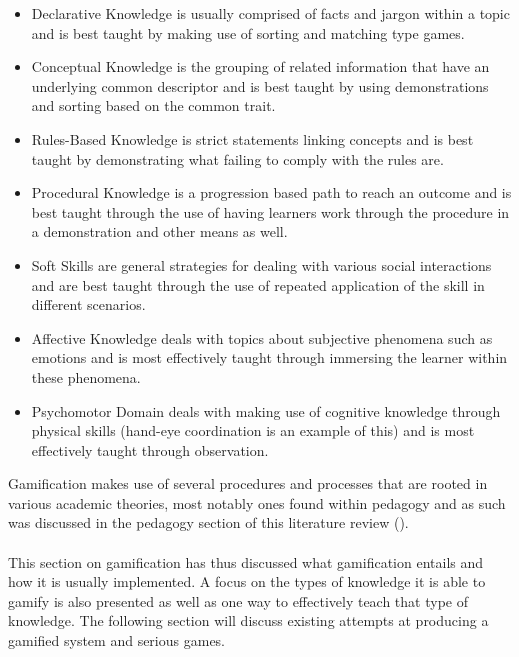 \begin{itemize}
\item Declarative Knowledge is usually comprised of facts and jargon within a topic and is best taught by making use of sorting and matching type games.
\item Conceptual Knowledge is the grouping of related information that have an underlying common descriptor and is best taught by using demonstrations and sorting based on the common trait.
\item Rules-Based Knowledge is strict statements linking concepts and is best taught by demonstrating what failing to comply with the rules are.
\item Procedural Knowledge is a progression based path to reach an outcome and is best taught through the use of having learners work through the procedure in a demonstration and other means as well.
\item Soft Skills are general strategies for dealing with various social interactions and are best taught through the use of repeated application of the skill in different scenarios.
\item Affective Knowledge deals with topics about subjective phenomena such as emotions and is most effectively taught through immersing the learner within these phenomena.

\item Psychomotor Domain deals with making use of cognitive knowledge through physical skills (hand-eye coordination is an example of this) and is most effectively taught through observation.
\end{itemize}
Gamification makes use of several procedures and processes that are rooted in various academic theories, most notably ones found within pedagogy and as such was discussed in the pedagogy section of this literature review (\cite{KappArticle2012}).
\\\\
This section on gamification has thus discussed what gamification entails and how it is usually implemented. A focus on the types of knowledge it is able to gamify is also presented as well as one way to effectively teach that type of knowledge. The following section will discuss existing attempts at producing a gamified system and serious games.

